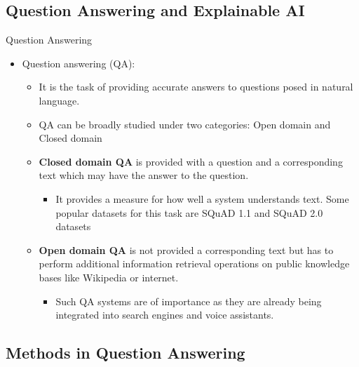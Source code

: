 \documentclass[10pt]{beamer}
\begin{document}
\subsection{Question Answering and Explainable AI}
\begin{frame}{Question Answering}
\begin{itemize}
    \item 
    Question answering (QA):
        \begin{itemize}
            \item It is the task of providing accurate answers to questions posed in natural language.
            \item QA can be broadly studied under two categories: Open domain and Closed domain
            \item \textbf{Closed domain QA}  is provided with a question and a corresponding text which may have the answer to the question.
            \begin{itemize}
                \item  It provides a measure for how well a system understands text. Some popular datasets for this task are SQuAD 1.1 and SQuAD 2.0 datasets
            \end{itemize}
            \item \textbf{Open domain QA} is not provided a corresponding text but has to perform additional information retrieval operations on public knowledge bases like Wikipedia or internet.
            \begin{itemize}
                \item Such QA systems are of importance as they are already being integrated into search engines and voice assistants.
            \end{itemize}
        \end{itemize}
        \end{itemize}
\end{frame}

\subsection{Methods in Question Answering}
\end{document}
